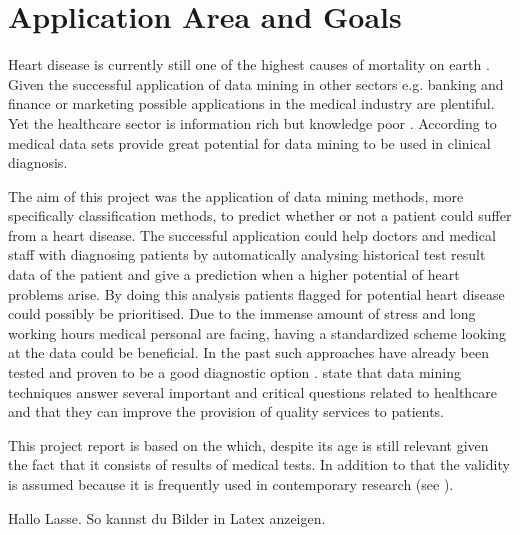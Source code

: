 \section{Application Area and Goals}

Heart disease is currently still one of the highest causes of mortality on earth \citep{nahar2013, kavitha2016, statistischesbundesamt2020}.
Given the successful application of data mining in other sectors e.g. banking and finance or marketing \citep{keles2017} possible applications in the medical industry are plentiful. Yet the healthcare sector is information rich but knowledge poor \citep{soni2011}. According to \citet{soni2011} medical data sets provide great potential for data mining to be used in clinical diagnosis.


The aim of this project was the application of data mining methods, more specifically classification methods, to predict whether or not a patient could suffer from a heart disease. The successful application could help doctors and medical staff with diagnosing patients by automatically analysing historical test result data of the patient and give a prediction when a higher potential of heart problems arise. By doing this analysis patients flagged for potential heart disease could possibly be prioritised. Due to the immense amount of stress and long working hours medical personal are facing, having a standardized scheme looking at the data could be beneficial. 
In the past such approaches have already been tested and proven to be a good diagnostic option \citep{usharani2011}. \citet{jabbar2013} state that data mining techniques answer several important and critical questions related to healthcare and that they can improve the provision of quality services to patients.

This project report is based on the  \citep{janosi1988} which, despite its age is still relevant given the fact that it consists of results of medical tests. In addition to that the validity is assumed because it is frequently used in contemporary research (see \cite{usharani2011, aha1988, nahar2013}).


\newpage

Hallo Lasse. So kannst du Bilder in Latex anzeigen.

